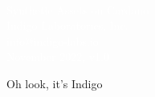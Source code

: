 \documentclass{article}
\begin{document}
\begin{sloppypar}

\begin{titlepage}
\sffamily\selectfont
\centering
\vspace*{7cm}
{}\\[5\baselineskip]
\textcolor{white}{
{\Huge Synthetic Assets on Cardano}\\[2\baselineskip]
{\Large Indigo Laboratories, Inc.}\\[0.5\baselineskip]
{\large info@indigo-labs.io}\\[3\baselineskip]
{\large November 2022, v1.0}
}
\end{titlepage}

Oh look, it's Indigo

\end{sloppypar}
\end{document}
